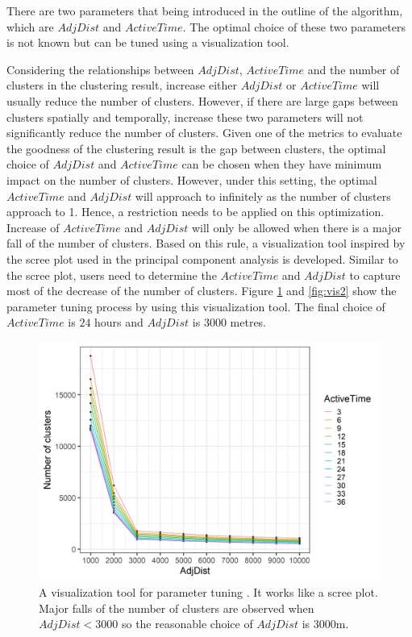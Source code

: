 There are two parameters that being introduced in the outline of the
algorithm, which are \(AdjDist\) and \(ActiveTime\). The optimal choice
of these two parameters is not known but can be tuned using a
visualization tool.

Considering the relationships between \(AdjDist\), \(ActiveTime\) and
the number of clusters in the clustering result, increase either
\(AdjDist\) or \(ActiveTime\) will usually reduce the number of
clusters. However, if there are large gaps between clusters spatially
and temporally, increase these two parameters will not significantly
reduce the number of clusters. Given one of the metrics to evaluate the
goodness of the clustering result is the gap between clusters, the
optimal choice of \(AdjDist\) and \(ActiveTime\) can be chosen when they
have minimum impact on the number of clusters. However, under this
setting, the optimal \(ActiveTime\) and \(AdjDist\) will approach to
infinitely as the number of clusters approach to 1. Hence, a restriction
needs to be applied on this optimization. Increase of \(ActiveTime\) and
\(AdjDist\) will only be allowed when there is a major fall of the
number of clusters. Based on this rule, a visualization tool inspired by
the scree plot used in the principal component analysis is developed.
Similar to the scree plot, users need to determine the \(ActiveTime\)
and \(AdjDist\) to capture most of the decrease of the number of
clusters. Figure \ref{fig:vis1} and \ref{fig:vis2} show the parameter
tuning process by using this visualization tool. The final choice of
\(ActiveTime\) is \(24\) hours and \(AdjDist\) is \(3000\) metres.

\begin{Schunk}
\begin{figure}

{\centering \includegraphics[width=0.8\linewidth]{figures/clustering_tuning_1} 

}

\caption[A visualization tool for parameter tuning ]{A visualization tool for parameter tuning . It works like a scree plot. Major falls of the number of clusters are observed when $AdjDist < 3000$ so the reasonable choice of $AdjDist$ is 3000m.}\label{fig:vis1}
\end{figure}
\end{Schunk}

